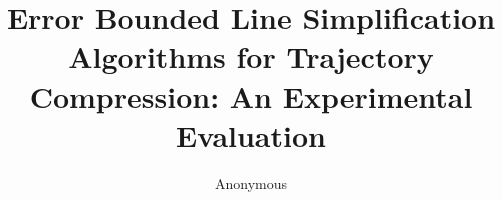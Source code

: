 \documentclass[acmsmall]{acmart}
\begin{document}
\title{Error Bounded Line Simplification Algorithms for Trajectory Compression: An Experimental Evaluation}

%
%
%
%
%



\author{Anonymous}
\end{document}
